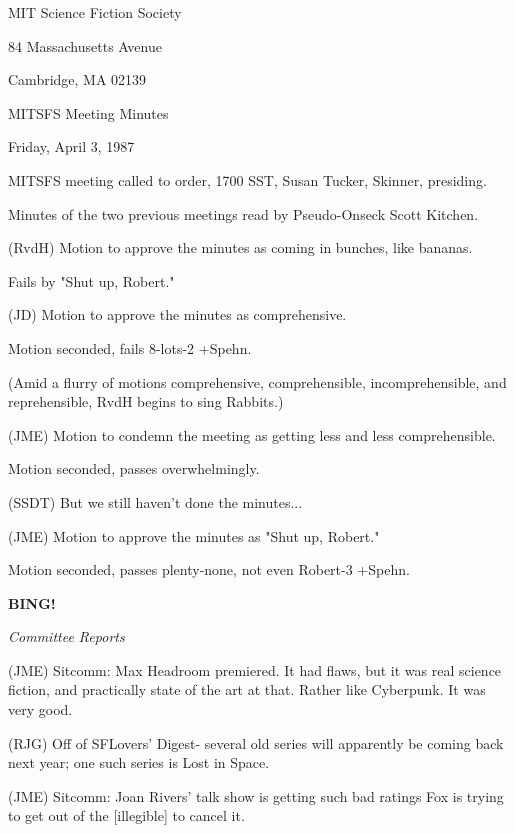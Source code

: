 \documentclass[12pt]{article}
\newcommand{\bing}{{\bf BING!} }
\newcommand{\goto}[1]{\bing \vskip 12pt \centerline{{\em{#1}}}}
\begin{document}
\begin{center}

MIT Science Fiction Society 

84 Massachusetts Avenue

Cambridge, MA 02139

\vspace{12pt}

MITSFS Meeting Minutes 

Friday, April 3, 1987

\end{center}
 
\vspace{18pt}

\setlength{\parskip}{6pt}

\noindent
MITSFS meeting called to order, 1700 SST,
Susan Tucker, Skinner, presiding.

Minutes of the two previous meetings read by Pseudo-Onseck Scott Kitchen.

(RvdH) Motion to approve the minutes as coming in bunches, like bananas.

Fails by "Shut up, Robert."

(JD) Motion to approve the minutes as comprehensive.

Motion seconded, fails 8-lots-2 +Spehn.

(Amid a flurry of motions comprehensive, comprehensible, incomprehensible, and reprehensible, RvdH begins to sing Rabbits.)

(JME) Motion to condemn the meeting as getting less and less comprehensible.

Motion seconded, passes overwhelmingly.

(SSDT) But we still haven't done the minutes...

(JME) Motion to approve the minutes as "Shut up, Robert."

Motion seconded, passes plenty-none, not even Robert-3 +Spehn.

\goto{Committee Reports}

(JME) Sitcomm: Max Headroom premiered. It had flaws, but it was real science fiction, and practically state of the art at that. Rather like Cyberpunk. It was very good.

(RJG) Off of SFLovers' Digest- several old series will apparently be coming back next year; one such series is Lost in Space.

(JME) Sitcomm: Joan Rivers' talk show is getting such bad ratings Fox is trying to get out of the [illegible] to cancel it.
\end{document}
